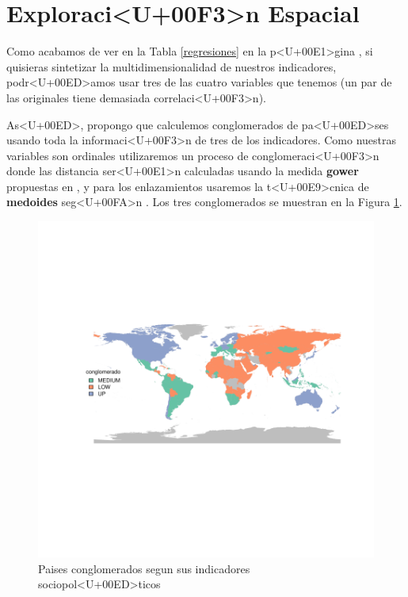 \documentclass{article}
\begin{document}
\clearpage

\section{Exploraci<U+00F3>n Espacial}

Como acabamos de ver en la Tabla \ref{regresiones} en la p<U+00E1>gina \pageref{regresiones}, si quisieras sintetizar la multidimensionalidad de nuestros indicadores, podr<U+00ED>amos usar tres de las cuatro variables que tenemos (un par de las originales tiene demasiada correlaci<U+00F3>n). 

As<U+00ED>, propongo que calculemos conglomerados de pa<U+00ED>ses usando toda la informaci<U+00F3>n de tres de los indicadores. Como nuestras variables son ordinales utilizaremos un proceso de conglomeraci<U+00F3>n donde las distancia ser<U+00E1>n calculadas usando la medida {\bf gower} propuestas en \cite{gower_general_1971}, y para los enlazamientos usaremos la t<U+00E9>cnica de {\bf medoides} seg<U+00FA>n \cite{reynolds_clustering_2006}. Los tres conglomerados se muestran en la Figura \ref{clustmap}.






\begin{figure}[h]
\centering
\begin{adjustbox}{width=11cm,height=8cm,clip,trim=1cm 2.5cm 0cm 2.5cm}
\includegraphics{paperVersion_6AMR-plotMap1}
\end{adjustbox}
\caption{Paises conglomerados segun sus indicadores sociopol<U+00ED>ticos}\label{clustmap}
\end{figure}



\end{document}
